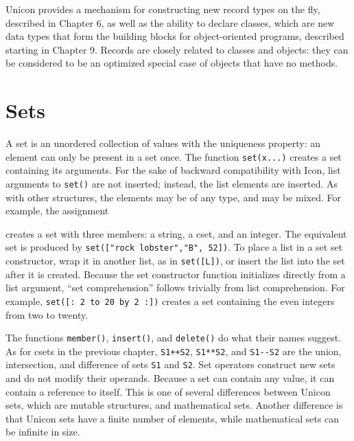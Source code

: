 Unicon provides a mechanism for constructing new record types on the
fly, described in Chapter 6, as well as the ability to declare classes,
which are new data types that form the building blocks for
object-oriented programs, described starting in Chapter 9. Records are
closely related to classes and objects: they can be considered to be an
optimized special case of objects that have no methods. \ 

\section{Sets}

A set is an unordered collection of values with the
uniqueness property: an element can only be present in a set once. The
function \texttt{set(x...)} creates a set containing its arguments. For
the sake of backward compatibility with Icon, list arguments to
\texttt{set()} are not inserted; instead, the list elements are
inserted. As with other structures, the elements may be of any type,
and may be mixed. For example, the assignment


\noindent
creates a set with three members: a string, a cset, and an integer. The
equivalent set is produced by
\texttt{set(["rock lobster","B", 52])}. To place a list in a set
set constructor, wrap it in another list, as in \texttt{set([L])},
or insert the list into the set after it is created. Because the set
constructor function initializes directly from a list argument,
``set comprehension'' follows trivially from list comprehension. For
example, \texttt{set([: 2 to 20 by 2 :])} creates a set containing the
even integers from two to twenty.

The functions \texttt{member()},
\texttt{insert()}, and
\texttt{delete()} do what their names suggest. As
for csets in the previous chapter, \texttt{S1++S2}, \texttt{S1**S2},
and \texttt{S1-{}-S2} are the union,
intersection, and difference of sets \texttt{S1} and \texttt{S2}. Set
operators construct new sets and do not modify their operands. Because
a set can contain any value, it can contain a
reference to itself. This is one of several
differences between Unicon sets, which are mutable structures, and
mathematical sets. Another difference is that Unicon sets have a finite
number of elements, while mathematical sets can be infinite in size.

